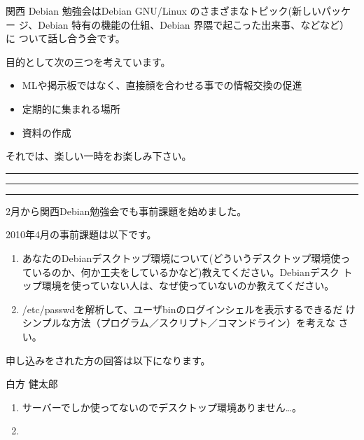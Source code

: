 \documentclass[mingoth,a4paper]{jsarticle}
\begin{document}
関西 Debian 勉強会はDebian GNU/Linux のさまざまなトピック(新しいパッケー
ジ、Debian 特有の機能の仕組、Debian 界隈で起こった出来事、などなど）に
ついて話し合う会です。

目的として次の三つを考えています。
\begin{itemize}
      \item MLや掲示板ではなく、直接顔を合わせる事での情報交換の促進
      \item 定期的に集まれる場所
      \item 資料の作成
\end{itemize}

それでは、楽しい一時をお楽しみ下さい。

\clearpage

\begin{minipage}[b]{0.2\hsize}
 {}
\end{minipage}
\begin{minipage}[b]{0.8\hsize}
\hrule
\vspace{2mm}
\hrule
\setcounter{tocdepth}{1}
\tableofcontents
\vspace{2mm}
\hrule
\end{minipage}


2月から関西Debian勉強会でも事前課題を始めました。

2010年4月の事前課題は以下です。

\begin{enumerate}
 \item あなたのDebianデスクトップ環境について(どういうデスクトップ環境使っ
       ているのか、何か工夫をしているかなど)教えてください。Debianデスク
       トップ環境を使っていない人は、なぜ使っていないのか教えてください。
 \item /etc/passwdを解析して、ユーザbinのログインシェルを表示するできるだ
       けシンプルな方法（プログラム／スクリプト／コマンドライン）を考えな
       さい。
\end{enumerate}

申し込みをされた方の回答は以下になります。

\begin{prework}{ 白方 健太郎 }

 \begin{enumerate}
  \item サーバーでしか使ってないのでデスクトップ環境ありません…。
  \item 　

\end{enumerate}

\end{prework}
\end{document}
